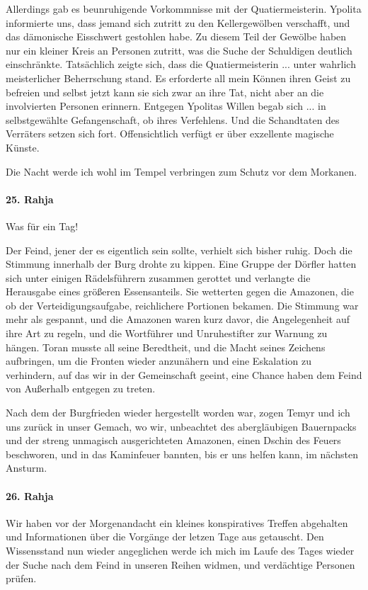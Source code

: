 Allerdings gab es beunruhigende Vorkommnisse mit der Quatiermeisterin.
Ypolita informierte uns, dass jemand sich zutritt zu den Kellergewölben verschafft, und das dämonische Eisschwert gestohlen habe. Zu diesem Teil der Gewölbe haben nur ein kleiner Kreis an Personen zutritt, was die Suche der Schuldigen deutlich einschränkte. Tatsächlich zeigte sich, dass die Quatiermeisterin ... unter wahrlich meisterlicher Beherrschung stand. Es erforderte all mein Können ihren Geist zu befreien und selbst jetzt kann sie sich zwar an ihre Tat, nicht aber an die involvierten Personen erinnern. Entgegen Ypolitas Willen begab sich ... in selbstgewählte Gefangenschaft, ob ihres Verfehlens. Und die Schandtaten des Verräters setzen sich fort. Offensichtlich verfügt er über exzellente magische Künste.

Die Nacht werde ich wohl im Tempel verbringen zum Schutz vor dem Morkanen.

\paragraph{25. Rahja}
Was für ein Tag!

Der Feind, jener der es eigentlich sein sollte, verhielt sich bisher ruhig. Doch die Stimmung innerhalb der Burg drohte zu kippen. Eine Gruppe der Dörfler hatten sich unter einigen Rädelsführern zusammen gerottet und verlangte die Herausgabe eines größeren Essensanteils. Sie wetterten gegen die Amazonen, die ob der Verteidigungsaufgabe, reichlichere Portionen bekamen. Die Stimmung war mehr als gespannt, und die Amazonen waren kurz davor, die Angelegenheit auf ihre Art zu regeln, und die Wortführer und Unruhestifter zur Warnung zu hängen. Toran musste all seine Beredtheit, und die Macht seines Zeichens aufbringen, um die Fronten wieder anzunähern und eine Eskalation zu verhindern, auf das wir in der Gemeinschaft geeint, eine Chance haben dem Feind von Außerhalb entgegen zu treten.

Nach dem der Burgfrieden wieder hergestellt worden war, zogen Temyr und ich uns zurück in unser Gemach, wo wir, unbeachtet des abergläubigen Bauernpacks und der streng unmagisch ausgerichteten Amazonen, einen Dschin des Feuers beschworen, und in das Kaminfeuer bannten, bis er uns helfen kann, im nächsten Ansturm.

\paragraph{26. Rahja}
Wir haben vor der Morgenandacht ein kleines konspiratives Treffen abgehalten und Informationen über die Vorgänge der letzen Tage aus getauscht. Den Wissensstand nun wieder angeglichen werde ich mich im Laufe des Tages wieder der Suche nach dem Feind in unseren Reihen widmen, und verdächtige Personen prüfen.


